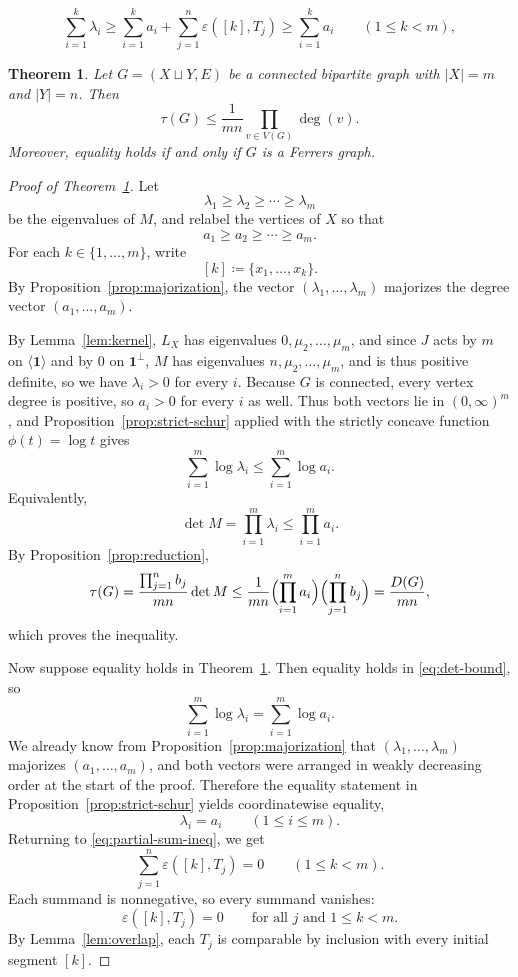 \documentclass[10pt,a4paper]{amsart}
\newtheorem{theorem}{Theorem}
\newcommand{\epsov}{\varepsilon}
\begin{document}
\begin{equation}
\sum_{i=1}^k \lambda_i
\ge
\sum_{i=1}^k a_i+\sum_{j=1}^n \epsov([k],T_j)
\ge
\sum_{i=1}^k a_i
\qquad (1\le k<m),
\end{equation}

\begin{theorem}\label{thm:main}
Let $G=(X\sqcup Y,E)$ be a connected bipartite graph with $|X|=m$ and $|Y|=n$. 
Then
\[
\tau(G)\le \frac{1}{mn}\prod_{v\in V(G)}\deg(v).
\]
Moreover, equality holds if and only if $G$ is a Ferrers graph.
\end{theorem}

\begin{proof}[Proof of Theorem~\ref{thm:main}]
Let
\[
\lambda_1\ge \lambda_2\ge \cdots \ge \lambda_m
\]
be the eigenvalues of $M$, and relabel the vertices of $X$ so that
\[
a_1\ge a_2\ge \cdots \ge a_m.
\]
For each $k\in\{1,\dots,m\}$, write
\[
[k]\coloneqq \{x_1,\dots,x_k\}.
\]
By Proposition~\ref{prop:majorization}, 
the vector $(\lambda_1,\dots,\lambda_m)$ majorizes 
the degree vector $(a_1,\dots,a_m)$.

By Lemma~\ref{lem:kernel}, $L_X$ has eigenvalues $0,\mu_2,\dots,\mu_m$, 
and since $J$ acts by $m$ on $\langle\mathbf1\rangle$ and by $0$ on 
$\mathbf1^\perp$, $M$ has eigenvalues $n,\mu_2,\dots,\mu_m$, and is 
thus positive definite, so we have $\lambda_i>0$ for every $i$. 
Because $G$ is connected, every vertex degree is positive, so $a_i>0$ 
for every $i$ as well. Thus both vectors lie in $(0,\infty)^m$, and 
Proposition~\ref{prop:strict-schur} applied with the strictly concave 
function $\phi(t)=\log t$ gives
\[
\sum_{i=1}^m \log \lambda_i\le \sum_{i=1}^m \log a_i.
\]
Equivalently,
\[
\det M=\prod_{i=1}^m \lambda_i\le \prod_{i=1}^m a_i.
\]
By Proposition~\ref{prop:reduction},
\[
\tau(G)=\frac{\prod_{j=1}^n b_j}{mn}\det M
\le
\frac{1}{mn}\Bigl(\prod_{i=1}^m a_i\Bigr)\Bigl(\prod_{j=1}^n b_j\Bigr)
=
\frac{D(G)}{mn},
\]
which proves the inequality.

Now suppose equality holds in Theorem~\ref{thm:main}. 
Then equality holds in \eqref{eq:det-bound}, so
\[
\sum_{i=1}^m \log \lambda_i=\sum_{i=1}^m \log a_i.
\]
We already know from Proposition~\ref{prop:majorization} that 
$(\lambda_1,\dots,\lambda_m)$ majorizes $(a_1,\dots,a_m)$, and both 
vectors were arranged in weakly decreasing order at the start of the proof. 
Therefore the equality statement in Proposition~\ref{prop:strict-schur} 
yields coordinatewise equality,
\[
\lambda_i=a_i\qquad (1\le i\le m).
\]
Returning to \eqref{eq:partial-sum-ineq}, we get
\[
\sum_{j=1}^n \epsov([k],T_j)=0
\qquad (1\le k<m).
\]
Each summand is nonnegative, so every summand vanishes:
\[
\epsov([k],T_j)=0
\qquad\text{for all }j\text{ and }1\le k<m.
\]
By Lemma~\ref{lem:overlap}, each $T_j$ is comparable by inclusion with every 
initial segment $[k]$.


\end{proof}
\end{document}
